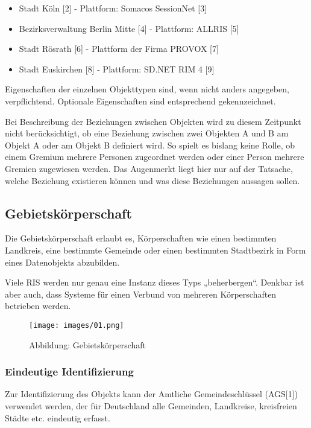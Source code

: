 \begin{itemize}
\item
  Stadt Köln {[}2{]} - Plattform: Somacos SessionNet {[}3{]}
\item
  Bezirksverwaltung Berlin Mitte {[}4{]} - Plattform: ALLRIS {[}5{]}
\item
  Stadt Rösrath {[}6{]} - Plattform der Firma PROVOX {[}7{]}
\item
  Stadt Euskirchen {[}8{]} - Plattform: SD.NET RIM 4 {[}9{]}
\end{itemize}

Eigenschaften der einzelnen Objekttypen sind, wenn nicht anders
angegeben, verpflichtend. Optionale Eigenschaften sind entsprechend
gekennzeichnet.

Bei Beschreibung der Beziehungen zwischen Objekten wird zu diesem
Zeitpunkt nicht berücksichtigt, ob eine Beziehung zwischen zwei Objekten
A und B am Objekt A oder am Objekt B definiert wird. So spielt es
bislang keine Rolle, ob einem Gremium mehrere Personen zugeordnet werden
oder einer Person mehrere Gremien zugewiesen werden. Das Augenmerkt
liegt hier nur auf der Tatsache, welche Beziehung existieren können und
was diese Beziehungen aussagen sollen.

\subsection{Gebietskörperschaft}

Die Gebietskörperschaft erlaubt es, Körperschaften wie einen bestimmten
Landkreis, eine bestimmte Gemeinde oder einen bestimmten Stadtbezirk in
Form eines Datenobjekts abzubilden.

Viele RIS werden nur genau eine Instanz dieses Typs „beherbergen``.
Denkbar ist aber auch, dass Systeme für einen Verbund von mehreren
Körperschaften betrieben werden.

\begin{figure}[htbp]
\centering
\texttt{[image: images/01.png]}
\caption{Abbildung: Gebietskörperschaft}
\end{figure}

\subsubsection{Eindeutige Identifizierung}

Zur Identifizierung des Objekts kann der Amtliche Gemeindeschlüssel
(AGS{[}1{]}) verwendet werden, der für Deutschland alle Gemeinden,
Landkreise, kreisfreien Städte etc. eindeutig erfasst.

